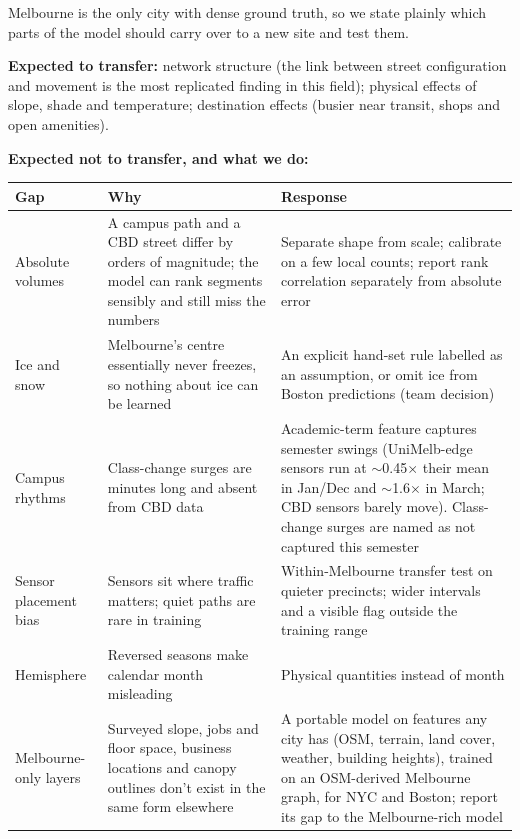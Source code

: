 \documentclass[11pt]{article}
\newcommand{\hrow}{\rowcolor{headgray}}
\begin{document}
Melbourne is the only city with dense ground truth, so we state plainly which parts of the model should carry over to a new site and test them.

\textbf{Expected to transfer:} network structure (the link between street configuration and movement is the most replicated finding in this field); physical effects of slope, shade and temperature; destination effects (busier near transit, shops and open amenities).

\textbf{Expected not to transfer, and what we do:}

\begin{xltabular}{\linewidth}{|L{3.2cm}|Y|Y|}
\hline\hrow
\textbf{Gap} & \textbf{Why} & \textbf{Response} \\\hline
\endhead
Absolute volumes & A campus path and a CBD street differ by orders of magnitude; the model can rank segments sensibly and still miss the numbers & Separate shape from scale; calibrate on a few local counts; report rank correlation separately from absolute error \\\hline
Ice and snow & Melbourne's centre essentially never freezes, so nothing about ice can be learned & An explicit hand-set rule labelled as an assumption, or omit ice from Boston predictions (team decision) \\\hline
Campus rhythms & Class-change surges are minutes long and absent from CBD data & Academic-term feature captures semester swings (UniMelb-edge sensors run at $\sim$0.45$\times$ their mean in Jan/Dec and $\sim$1.6$\times$ in March; CBD sensors barely move). Class-change surges are named as not captured this semester \\\hline
Sensor placement bias & Sensors sit where traffic matters; quiet paths are rare in training & Within-Melbourne transfer test on quieter precincts; wider intervals and a visible flag outside the training range \\\hline
Hemisphere & Reversed seasons make calendar month misleading & Physical quantities instead of month \\\hline
Melbourne-only layers & Surveyed slope, jobs and floor space, business locations and canopy outlines don't exist in the same form elsewhere & A portable model on features any city has (OSM, terrain, land cover, weather, building heights), trained on an OSM-derived Melbourne graph, for NYC and Boston; report its gap to the Melbourne-rich model \\\hline
\end{xltabular}
\end{document}

